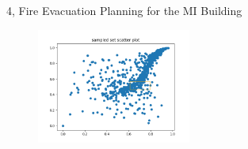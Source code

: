\documentclass[10pt,a4paper]{article}
\begin{document}
\begin{task}{4, Fire Evacuation Planning for the MI Building}
\begin{enumerate}
\begin{figure}[H]
		\label{fig:sampled-test-set}
		\centering
		\includegraphics[width=0.45\textwidth]{../plots/task4/sampled_set_scatter.png}
	\end{figure}
\end{enumerate}
\end{task}
\end{document}
